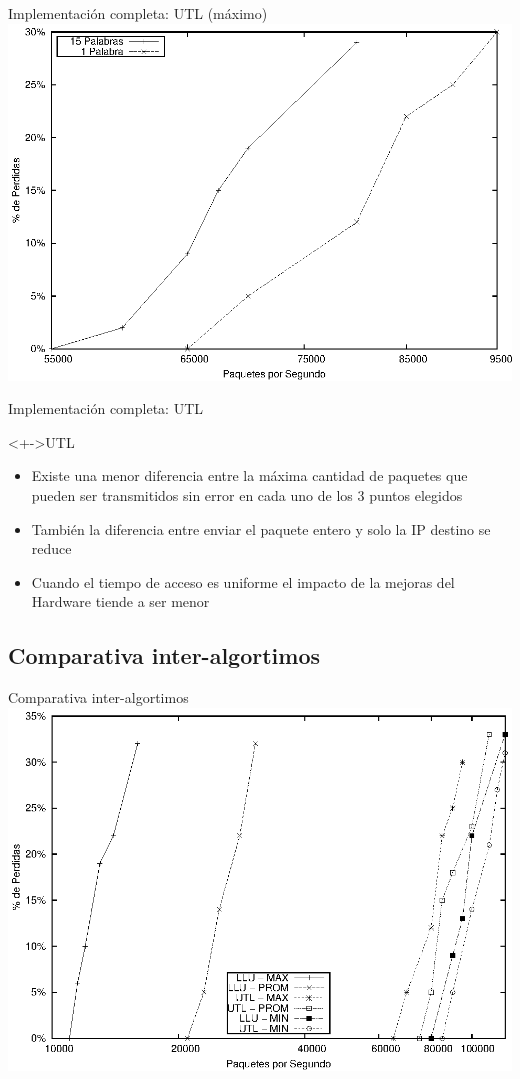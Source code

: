 \documentclass[xcolor=dvipsnames]{beamer}
\begin{document}
\begin{frame}{Implementación completa: UTL (máximo)} 
\center	
\includegraphics[scale=0.70]{figures/utlmax.eps} 
\end{frame}

\begin{frame}{Implementación completa: UTL} 
 \begin{block}<+->{UTL}   
    \begin{itemize}
      \scriptsize
     	\item Existe una menor diferencia entre la máxima cantidad de paquetes que pueden ser transmitidos sin error en cada uno de los 3 puntos elegidos
     	\item También la diferencia entre enviar el paquete entero y solo la IP destino se reduce
	\item Cuando el tiempo de acceso es uniforme el impacto de la mejoras del Hardware tiende a ser menor
    \end{itemize}
  \end{block}
\end{frame}

\subsection{Comparativa inter-algortimos}
\begin{frame}{Comparativa inter-algortimos} 
\center	
\includegraphics[scale=0.70]{figures/lluvsutl.eps} 
\end{frame}
\end{document}
